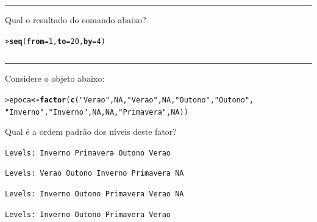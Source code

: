 \documentclass[a4paper,11pt,fleqn]{article}\usepackage[]{graphicx}\usepackage[]{color}
\makeatletter
\newcommand{\hlnum}[1]{\textcolor[rgb]{0,0,0}{#1}}%
\newcommand{\hlstr}[1]{\textcolor[rgb]{0,0,0}{#1}}%
\newcommand{\hlstd}[1]{\textcolor[rgb]{0,0,0}{#1}}%
\newcommand{\hlkwb}[1]{\textcolor[rgb]{0,0,0}{\textbf{#1}}}%
\newcommand{\hlkwc}[1]{\textcolor[rgb]{0,0,0}{\textbf{#1}}}%
\newcommand{\hlkwd}[1]{\textcolor[rgb]{0,0,0}{\textbf{#1}}}%
\newenvironment{kframe}{%
 \def\at@end@of@kframe{}%
 \ifinner\ifhmode%
  \def\at@end@of@kframe{\end{minipage}}%
  \begin{minipage}{\columnwidth}%
 \fi\fi%
 \def\FrameCommand##1{\hskip\@totalleftmargin \hskip-\fboxsep
 \colorbox{shadecolor}{##1}\hskip-\fboxsep
     \hskip-\linewidth \hskip-\@totalleftmargin \hskip\columnwidth}%
 \MakeFramed {\advance\hsize-\width
   \@totalleftmargin\z@ \linewidth\hsize
   \@setminipage}}%
 {\par\unskip\endMakeFramed%
 \at@end@of@kframe}
\newenvironment{knitrout}{}{} %
\theoremstyle{definition}
\makeatother
\begin{document}
\vspace{0.3cm}
\hrule
\vspace{0.3cm}

\begin{compactenum}[16.]
\item Qual o resultado do comando abaixo?
\begin{knitrout}\small
{}\color{fgcolor}\begin{kframe}
\begin{alltt}
\hlstd{> }\hlkwd{seq}\hlstd{(}\hlkwc{from} \hlstd{=} \hlnum{1}\hlstd{,} \hlkwc{to} \hlstd{=} \hlnum{20}\hlstd{,} \hlkwc{by} \hlstd{=} \hlnum{4}\hlstd{)}
\end{alltt}
\end{kframe}
\end{knitrout}
\begin{tabular}{| p{1cm} | p{1cm} | p{1cm} | p{1cm} | p{1cm} | p{1cm}
  | p{1cm} | p{1cm} | p{1cm} | p{1cm} |}
  \hline
  & & & & & & & & & \\
  \hline
\end{tabular}
\end{compactenum}

\vspace{0.3cm}
\hrule
\vspace{0.3cm}

\begin{compactenum}[17.]
\item Considere o objeto abaixo:
\begin{knitrout}\small
{}\color{fgcolor}\begin{kframe}
\begin{alltt}
\hlstd{> }\hlstd{epoca} \hlkwb{<-} \hlkwd{factor}\hlstd{(}\hlkwd{c}\hlstd{(}\hlstr{"Verao"}\hlstd{,} \hlnum{NA}\hlstd{,} \hlstr{"Verao"}\hlstd{,} \hlnum{NA}\hlstd{,} \hlstr{"Outono"}\hlstd{,} \hlstr{"Outono"}\hlstd{,}
\hlstd{  }                  \hlstr{"Inverno"}\hlstd{,} \hlstr{"Inverno"}\hlstd{,} \hlnum{NA}\hlstd{,} \hlnum{NA}\hlstd{,} \hlstr{"Primavera"}\hlstd{,} \hlnum{NA}\hlstd{))}
\end{alltt}
\end{kframe}
\end{knitrout}
Qual é a ordem padrão dos níveis deste fator?
\begin{compactenum}
\item \texttt{Levels: Inverno Primavera Outono Verao}
\item \texttt{Levels: Verao Outono Inverno Primavera NA}
\item \texttt{Levels: Inverno Outono Primavera Verao NA}
\item \texttt{Levels: Inverno Outono Primavera Verao}
\end{compactenum}
\end{compactenum}
\end{document}
